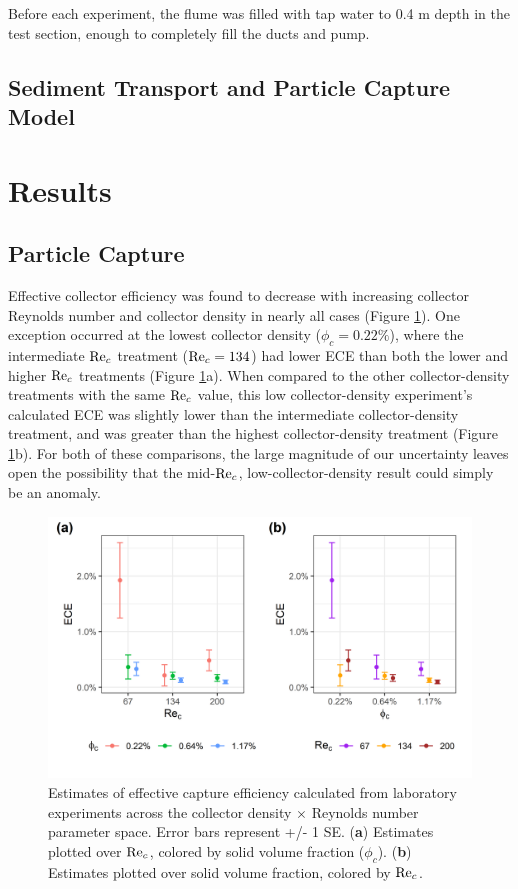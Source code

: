 \documentclass[geosciences,article,submit,moreauthors,pdftex]{Definitions/mdpi}
\begin{document}
Before each experiment, the flume was filled with tap water to 0.4 m depth in the test section, enough to completely fill the ducts and pump.

\subsection{Sediment Transport and Particle Capture Model}

\section{Results}

\subsection{Particle Capture}

Effective collector efficiency was found to decrease with increasing collector Reynolds number and collector density in nearly all cases (Figure \ref{fig:ece}). One exception occurred at the lowest collector density ($\phi_c = 0.22\%$), where the intermediate $\mathrm{Re}_c$ treatment ($\mathrm{Re}_c = 134$) had lower ECE than both the lower and higher $\mathrm{Re}_c$ treatments (Figure \ref{fig:ece}a). When compared to the other collector-density treatments with the same $\mathrm{Re}_c$ value, this low collector-density experiment's calculated ECE was slightly lower than the intermediate collector-density treatment, and was greater than the highest collector-density treatment (Figure \ref{fig:ece}b). For both of these comparisons, the large magnitude of our uncertainty leaves open the possibility that the mid-$\mathrm{Re}_c$, low-collector-density result could simply be an anomaly.

\begin{figure}[H]
\centering
\includegraphics[width=5in]{../pics/ece_plot.png}
\caption{Estimates of effective capture efficiency calculated from laboratory experiments across the collector density $\times$ Reynolds number parameter space. Error bars represent +/- 1 SE. (\textbf{a}) Estimates plotted over $\mathrm{Re}_c$, colored by solid volume fraction ($\phi_c$). (\textbf{b}) Estimates plotted over solid volume fraction, colored by $\mathrm{Re}_c$.}
\label{fig:ece}
\end{figure}   
\end{document}
